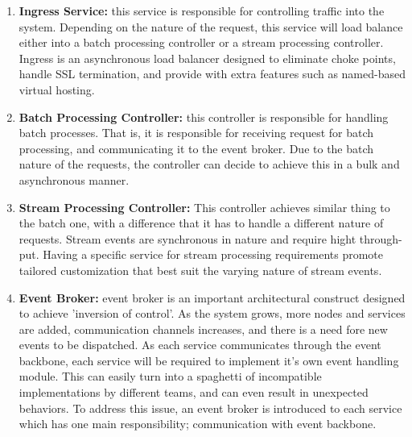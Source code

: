 \documentclass[runningheads]{llncs}
\begin{document}
\begin{enumerate}
    \item \textbf{Ingress Service:} this service is responsible for controlling traffic into the system. Depending on the nature of the request, this service will load balance either into a batch processing controller or a stream processing controller. Ingress is an asynchronous load balancer designed to eliminate choke points, handle SSL termination, and provide with extra features such as named-based virtual hosting. 
    

    \item \textbf{Batch Processing Controller:} this controller is responsible for handling batch processes. That is, it is responsible for receiving request for batch processing, and communicating it to the event broker. Due to the batch nature of the requests, the controller can decide to achieve this in a bulk and asynchronous manner. 
    
    \item \textbf{Stream Processing Controller:} This controller achieves similar thing to the batch one, with a difference that it has to handle a different nature of requests. Stream events are synchronous in nature and require hight through-put. Having a specific service for stream processing requirements promote tailored customization that best suit the varying nature of stream events. 
    \item \textbf{Event Broker:} event broker is an important architectural construct designed to achieve 'inversion of control'. As the system grows, more nodes and services are added, communication channels increases, and there is a need fore new events to be dispatched. As each service communicates through the event backbone, each service will be required to implement it's own event handling module. This can easily turn into a spaghetti of incompatible implementations by different teams, and can even result in unexpected behaviors. To address this issue, an event broker is introduced to each service which has one main responsibility; communication with event backbone. 
    

\end{enumerate}
\end{document}
